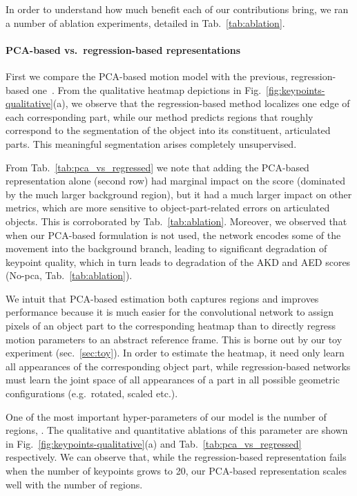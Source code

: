 \documentclass[final]{cvpr}
\begin{document}
In order to understand how much benefit each of our contributions bring, we ran a number of ablation experiments, detailed in Tab.~\ref{tab:ablation}.\paragraph{PCA-based vs.~regression-based representations} First we compare the PCA-based motion model with the previous, regression-based one~\cite{fomm}. From the qualitative heatmap depictions in Fig.~\ref{fig:keypoints-qualitative}(a), we observe that the regression-based method localizes one edge of each corresponding part, while our method predicts regions that roughly correspond to the segmentation of the object into its constituent, articulated parts. This meaningful segmentation arises completely unsupervised.

From Tab.~\ref{tab:pca_vs_regressed} we note that adding the PCA-based representation alone (second row) had marginal impact on the  score (dominated by the much larger background region), but it had a much larger impact on other metrics, which are more sensitive to object-part-related errors on articulated objects. This is corroborated by Tab.~\ref{tab:ablation}. Moreover, we observed that when our PCA-based formulation is not used, the network encodes some of the movement into the background branch, leading to significant degradation of keypoint quality, which in turn leads to degradation of the AKD and AED scores (No-pca, Tab.~\ref{tab:ablation}).


We intuit that PCA-based estimation both captures regions and improves performance because it is much easier for the convolutional network to assign pixels of an object part to the corresponding heatmap than to directly regress motion parameters to an abstract reference frame. This is borne out by our toy experiment (sec.\ \ref{sec:toy}). In order to estimate the heatmap, it need only learn all appearances of the corresponding object part, while regression-based networks must learn the joint space of all appearances of a part in all possible geometric configurations (e.g.~rotated, scaled etc.).


One of the most important hyper-parameters of our model is the number of regions, . The qualitative and quantitative ablations of this parameter are shown in Fig.~\ref{fig:keypoints-qualitative}(a) and Tab.~\ref{tab:pca_vs_regressed} respectively. We can observe that, while the regression-based representation fails when the number of keypoints grows to 20, our PCA-based representation scales well with the number of regions.
\end{document}

